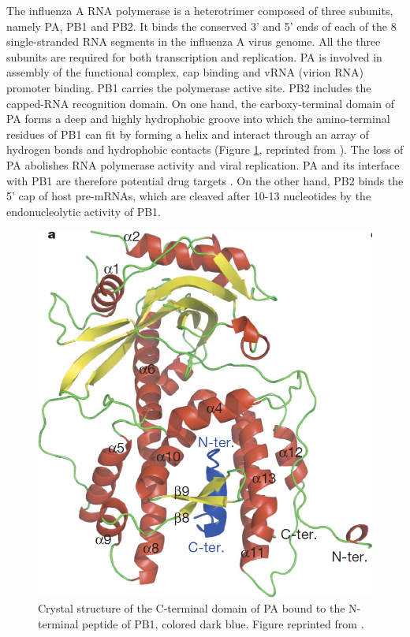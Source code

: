 The influenza A RNA polymerase is a heterotrimer composed of three subunits, namely PA, PB1 and PB2. It binds the conserved 3' and 5' ends of each of the 8 single-stranded RNA segments in the influenza A virus genome. All the three subunits are required for both transcription and replication. PA is involved in assembly of the functional complex, cap binding and vRNA (virion RNA) promoter binding. PB1 carries the polymerase active site. PB2 includes the capped-RNA recognition domain. On one hand, the carboxy-terminal domain of PA forms a deep and highly hydrophobic groove into which the amino-terminal residues of PB1 can fit by forming a helix and interact through an array of hydrogen bonds and hydrophobic contacts \citep{1141} (Figure \ref{Case:InfluenzaPAPB1}, reprinted from \citep{1141}). The loss of PA abolishes RNA polymerase activity and viral replication. PA and its interface with PB1 are therefore potential drug targets \citep{1141}. On the other hand, PB2 binds the 5' cap of host pre-mRNAs, which are cleaved after 10-13 nucleotides by the endonucleolytic activity of PB1.

\begin{figure}
\centering
\includegraphics[width=\linewidth]{Case/InfluenzaPAPB1.png}
\caption{Crystal structure of the C-terminal domain of PA bound to the N-terminal peptide of PB1, colored dark blue. Figure reprinted from \citep{1141}.}
\label{Case:InfluenzaPAPB1}
\end{figure}

